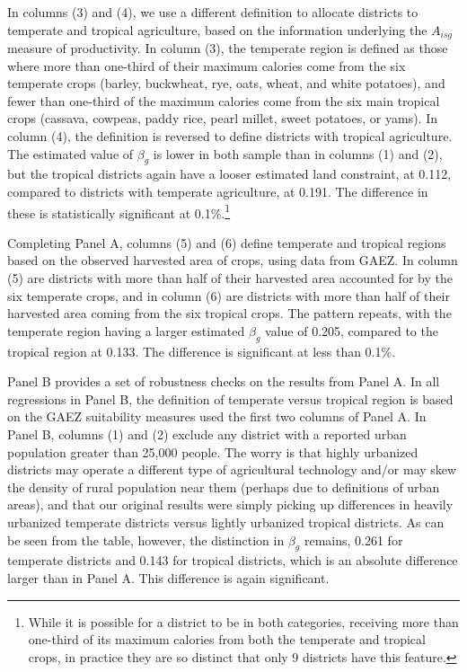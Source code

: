 \documentclass[11pt]{article}
\begin{document}
In columns (3) and (4), we use a different definition to allocate districts to temperate and tropical agriculture, based on the information underlying the $A_{isg}$ measure of productivity. In column (3), the temperate region is defined as those where more than one-third of their maximum calories come from the six temperate crops (barley, buckwheat, rye, oats, wheat, and white potatoes), and fewer than one-third of the maximum calories come from the six main tropical crops (cassava, cowpeas, paddy rice, pearl millet, sweet potatoes, or yams). In column (4), the definition is reversed to define districts with tropical agriculture. The estimated value of $\beta_g$ is lower in both sample than in columns (1) and (2), but the tropical districts again have a looser estimated land constraint, at 0.112, compared to districts with temperate agriculture, at 0.191. The difference in these is statistically significant at 0.1\%.\footnote{While it is possible for a district to be in both categories, receiving more than one-third of its maximum calories from both the temperate and tropical crops, in practice they are so distinct that only 9 districts have this feature.}

Completing Panel A, columns (5) and (6) define temperate and tropical regions based on the observed harvested area of crops, using data from GAEZ. In column (5) are districts with more than half of their harvested area accounted for by the six temperate crops, and in column (6) are districts with more than half of their harvested area coming from the six tropical crops. The pattern repeats, with the temperate region having a larger estimated $\beta_g$ value of 0.205, compared to the tropical region at 0.133. The difference is significant at less than 0.1\%.

Panel B provides a set of robustness checks on the results from Panel A. In all regressions in Panel B, the definition of temperate versus tropical region is based on the GAEZ suitability measures used the first two columns of Panel A. In Panel B, columns (1) and (2) exclude any district with a reported urban population greater than 25,000 people. The worry is that highly urbanized districts may operate a different type of agricultural technology and/or may skew the density of rural population near them (perhaps due to definitions of urban areas), and that our original results were simply picking up differences in heavily urbanized temperate districts versus lightly urbanized tropical districts. As can be seen from the table, however, the distinction in $\beta_g$ remains, 0.261 for temperate districts and 0.143 for tropical districts, which is an absolute difference larger than in Panel A. This difference is again significant.
\end{document}
